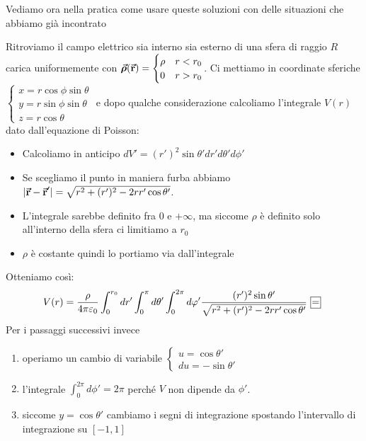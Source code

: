 Vediamo ora nella pratica come usare queste soluzioni con delle situazioni che abbiamo già incontrato
\begin{examplewt}
	Ritroviamo il campo elettrico sia interno sia esterno di una sfera di raggio $R$ carica uniformemente con $\vb*{\va{\rho}}(\vb*{\va{r}})=\begin{cases}
		\rho & r<r_0\\
		0 & r>r_0
	\end{cases}$. 
	Ci mettiamo in coordinate sferiche$\begin{cases}
		x=r\cos\phi\sin\theta\\
		y=r\sin\phi\sin\theta\\
		z=r\cos\theta
	\end{cases}$
	e dopo qualche considerazione calcoliamo l'integrale $V(r)$ dato dall'equazione di Poisson:
	\begin{itemize}
		\item Calcoliamo in anticipo $dV'=(r')^2\sin\theta 'dr'd\theta 'd\phi '$
		\item Se scegliamo il punto in maniera furba abbiamo $|\vb*{\va{r}}-\vb*{\va{r}}'|=\sqrt{r^2+(r')^2-2rr'\cos\theta '}$.
		\item L'integrale sarebbe definito fra $0$ e $+\infty$, ma siccome $\rho$ è definito solo all'interno della sfera ci limitiamo a $r_0$
		\item $\rho$ è costante quindi lo portiamo via dall'integrale
	\end{itemize}
	Otteniamo così:
	\begin{gather*}
		V(r)=\frac{\rho}{4\pi\epsilon_0}\int^{r_0}_0dr' \int^\pi_0 d\theta' \int^{2\pi}_0 d\phi' \frac{(r')^2 \sin\theta '}{\sqrt{r^2+(r')^2 -2rr'\cos\theta '}}\squarequal	
	\end{gather*}
	Per i passaggi successivi invece
	\begin{enumerate}
		\item operiamo un cambio di variabile $\begin{cases}
		u=\cos\theta'\\
		du=-\sin\theta'
	\end{cases}$
		\item l'integrale $\int^{2\pi}_0 d\phi'=2\pi$ perché $V$ non dipende da $\phi'$.
		\item siccome $y=\cos\theta'$ cambiamo i segni di integrazione spostando l'intervallo di integrazione su $[-1,1]$%

\end{enumerate}
\end{examplewt}
